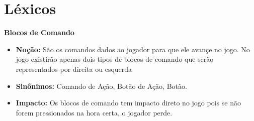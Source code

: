 \section{Léxicos}

\textbf{Blocos de Comando}
\begin{itemize}
\item\textbf{Noção:} São os comandos dados ao jogador para que ele avançe no jogo. No jogo existirão apenas dois tipos de blocos de comando que serão representados por direita ou esquerda
\item\textbf{Sinônimos:} Comando de Ação, Botão de Ação, Botão.
\item\textbf{Impacto:} Os blocos de comando tem impacto direto no jogo pois se não forem pressionados na hora certa, o jogador perde.
\end{itemize}
